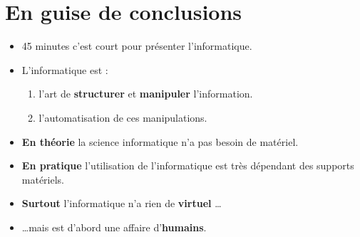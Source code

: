 \section[Conclusion]{En guise de conclusions}
\begin{frame}
	\begin{itemize}
		\item 45 minutes c'est court pour présenter l'informatique.
		\item L'informatique est :
		\begin{enumerate}
			\item l'art de \textbf{structurer} et \textbf{manipuler} l'information.
			\item l'automatisation de ces manipulations.
		\end{enumerate}
		\item \textbf{En théorie} la science informatique n'a pas besoin de matériel.
		\item \textbf{En pratique} l'utilisation de l'informatique est très dépendant des supports matériels.
		\item \textbf{Surtout} l'informatique n'a rien de \textbf{virtuel} \ldots
		\item \ldots mais est d'abord une affaire d'\textbf{humains}.
	\end{itemize}
\end{frame}

